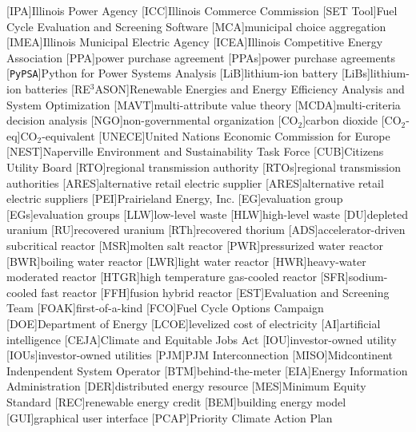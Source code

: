 [IPA]{Illinois Power Agency}
[ICC]{Illinois Commerce Commission}
[SET Tool]{Fuel Cycle Evaluation and Screening Software}
[MCA]{municipal choice aggregation}
[IMEA]{Illinois Municipal Electric Agency}
[ICEA]{Illinois Competitive Energy Association}
[PPA]{power purchase agreement}
[PPAs]{power purchase agreements}
[\texttt{PyPSA}]{Python for Power Systems Analysis}
[LiB]{lithium-ion battery}
[LiBs]{lithium-ion batteries}
[RE$^3$ASON]{Renewable Energies and Energy Efficiency Analysis and System Optimization}
[MAVT]{multi-attribute value theory}
[MCDA]{multi-criteria decision analysis}
[NGO]{non-governmental organization}
[CO$_2$]{carbon dioxide}
[CO$_2$-eq]{CO$_2$-equivalent}
[UNECE]{United Nations Economic Commission for Europe}
[NEST]{Naperville Environment and Sustainability Task Force}
[CUB]{Citizens Utility Board}
[RTO]{regional transmission authority}
[RTOs]{regional transmission authorities}
[ARES]{alternative retail electric supplier}
[ARES]{alternative retail electric suppliers}
[PEI]{Prairieland Energy, Inc.}
[EG]{evaluation group}
[EGs]{evaluation groups}
[LLW]{low-level waste}
[HLW]{high-level waste}
[DU]{depleted uranium}
[RU]{recovered uranium}
[RTh]{recovered thorium}
[ADS]{accelerator-driven subcritical reactor}
[MSR]{molten salt reactor}
[PWR]{pressurized water reactor}
[BWR]{boiling water reactor}
[LWR]{light water reactor}
[HWR]{heavy-water moderated reactor}
[HTGR]{high temperature gas-cooled reactor}
[SFR]{sodium-cooled fast reactor}
[FFH]{fusion hybrid reactor}
[EST]{Evaluation and Screening Team}
[FOAK]{first-of-a-kind}
[FCO]{Fuel Cycle Options Campaign}
[DOE]{Department of Energy}
[LCOE]{levelized cost of electricity}
[AI]{artificial intelligence}
[CEJA]{Climate and Equitable Jobs Act}
[IOU]{investor-owned utility}
[IOUs]{investor-owned utilities}
[PJM]{PJM Interconnection}
[MISO]{Midcontinent Indenpendent System Operator}
[BTM]{behind-the-meter}
[EIA]{Energy Information Administration}
[DER]{distributed energy resource}
[MES]{Minimum Equity Standard}
[REC]{renewable energy credit}
[BEM]{building energy model}
[GUI]{graphical user interface}
[PCAP]{Priority Climate Action Plan}


